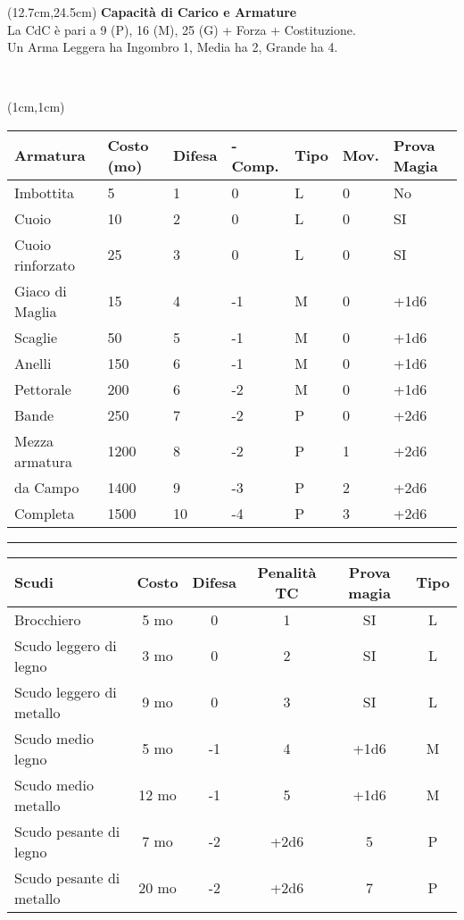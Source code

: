 \documentclass[a4paper,12 pt,openany]{book}
\newcommand{\riga}{\rule{\textwidth}{0.4pt}}
\begin{document}
\begin{textblock*}{7.8cm}(12.7cm,24.5cm) %
\textbf{Capacità di Carico e Armature}\\
La CdC è pari a 9 (P), 16 (M), 25 (G) + Forza + Costituzione.\\
Un Arma Leggera ha Ingombro 1, Media ha 2, Grande ha 4.
\end{textblock*}

~\newpage

\begin{textblock*}{15cm}(1cm,1cm) %

\begin{tabular}{lllllll}
\textbf{Armatura} & \textbf{Costo (mo)} & \textbf{Difesa} & \textbf{-Comp.} &  \textbf{Tipo} & \textbf{Mov.} & \textbf{Prova Magia}\\
\hline
Imbottita   & 5    & 1   & 0  &  L   & 0   & No\\
Cuoio   & 10   & 2   & 0   & L   & 0   & SI\\
Cuoio rinforzato   & 25  &3  & 0   &    L   & 0 &SI \\
Giaco di Maglia   & 15   & 4  & -1  &  M   & 0  &+1d6\\
Scaglie& 50   & 5  & -1  &  M   & 0 &+1d6 \\
Anelli & 150  & 6  & -1  &  M   & 0  &+1d6\\
Pettorale    & 200  & 6  & -2  &  M  &  0 &+1d6 \\
Bande   & 250  & 7  & -2  &  P   & 0  &+2d6 \\
Mezza armatura   & 1200 & 8  & -2  &  P   & 1 &+2d6  \\
da Campo& 1400 & 9 & -3  &   P   & 2  &+2d6 \\
Completa& 1500 & 10  & -4  & P   & 3  &+2d6 \\
\end{tabular}

\riga

\begin{tabular}{lccccc}
\textbf{Scudi} & \textbf{Costo} & \textbf{Difesa} & \textbf{Penalità TC} & \textbf{Prova magia} & \textbf{Tipo}\\
\hline
Brocchiero& 5 mo  &  0& 1& SI& L\\
Scudo leggero di legno   & 3 mo  &  0& 2& SI  & L\\
Scudo leggero di metallo & 9  mo  &  0& 3&SI  & L\\
Scudo medio legno   & 5 mo   &  -1& 4& +1d6  & M\\
Scudo medio metallo & 12 mo  & -1  & 5& +1d6  & M\\
Scudo pesante di legno   & 7  mo  &  -2    & +2d6&5  & P\\
Scudo pesante di metallo & 20 mo  &  -2    & +2d6&7  & P\\
\end{tabular}


\end{textblock*}
\end{document}
